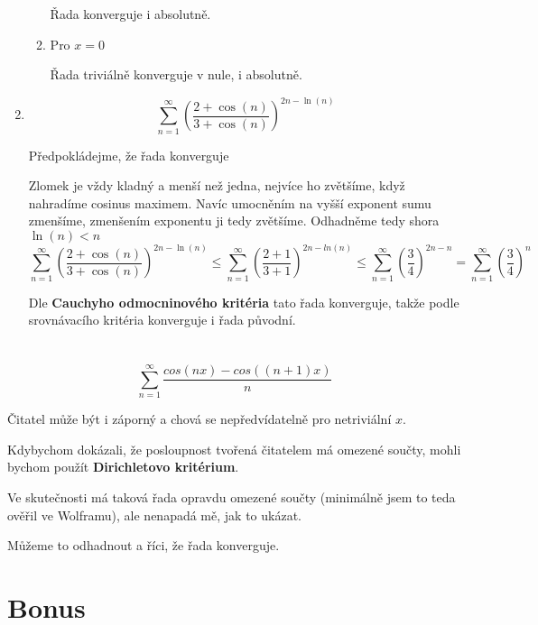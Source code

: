 \documentclass[10pt,a4paper]{article}
\theoremstyle{plain}
\theoremstyle{definition}
\begin{document}
\begin{enumerate}[label=(\alph*)]
\begin{enumerate}[label=(\roman*)]
Řada konverguje i absolutně.

\item Pro $x = 0$

Řada triviálně konverguje v nule, i absolutně.

\end{enumerate}

\item \[\sum_{n=1}^\infty  \left(\frac{2+\cos(n)}{3 + \cos(n)}\right)^{2n - \ln(n)} \]

Předpokládejme, že řada konverguje

Zlomek je vždy kladný a menší než jedna, nejvíce ho zvětšíme, když nahradíme cosinus maximem. Navíc umocněním na vyšší exponent sumu zmenšíme, zmenšením exponentu ji tedy zvětšíme. Odhadněme tedy shora $ \ln(n) <n$
\[\sum_{n=1}^\infty  \left(\frac{2+\cos(n)}{3 + \cos(n)}\right)^{2n - \ln(n)} \leq 
\sum_{n=1}^\infty  \left(\frac{2+1}{3+1}\right)^{2n - ln(n)} \leq \sum_{n=1}^\infty  \left(\frac34\right)^{2n - n} 
=\sum_{n=1}^\infty  \left(\frac34\right)^{n}  \]

Dle \textbf{Cauchyho odmocninového kritéria} tato řada konverguje, takže podle srovnávacího kritéria konverguje i řada původní.

\end{enumerate}

\section{}

\[ \sum_{n=1}^\infty \frac{cos(nx) - cos((n + 1)x)}{n}\]

Čitatel může být i záporný a chová se nepředvídatelně pro netriviální $x$.

Kdybychom dokázali, že posloupnost tvořená čitatelem má omezené součty, mohli bychom použít \textbf{Dirichletovo kritérium}.

Ve skutečnosti má taková řada opravdu omezené součty (minimálně jsem to teda ověřil ve Wolframu), ale nenapadá mě, jak to ukázat.

Můžeme to odhadnout a říci, že řada konverguje.

\section{Bonus}
\end{document}
